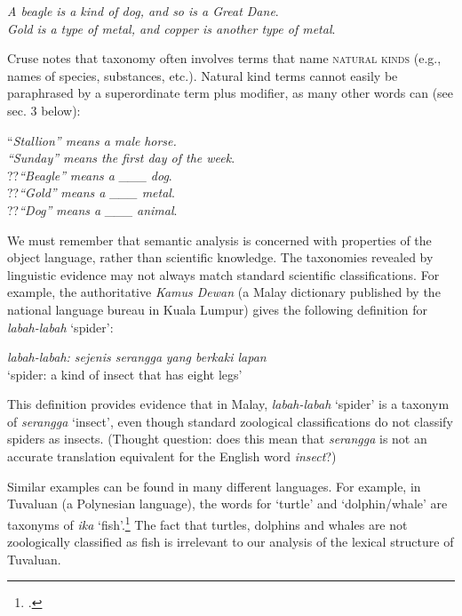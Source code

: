 \ea \label{ex:6.19} \ea \textit{A beagle} \textit{is a kind of dog, and so is a Great Dane}.\\
\ex \textit{Gold} \textit{is a type of metal, and copper is another type of metal}.
\z \z


Cruse notes that taxonomy often involves terms that name \textsc{natural kinds} (e.g., names of species, substances, etc.). Natural kind terms cannot easily be paraphrased by a superordinate term plus modifier, as many other words can (see sec. 3 below):


\ea 
\label{ex:6.20}
\ea “\textit{Stallion” means a male} \textit{horse.}\\
\ex \textit{“Sunday” mean}\textit{s the first day of the week}.\\
\ex ??\textit{“Beagle”} \textit{means a \_\_\_} \textit{dog}.\\
\ex ??\textit{“Gold”} \textit{means a \_\_\_ metal}.\\
\ex ??\textit{“Dog”} \textit{means a \_\_\_} \textit{animal}.
\z \z


We must remember that semantic analysis is concerned with properties of the object language, rather than scientific knowledge. The taxonomies revealed by linguistic evidence may not always match standard scientific classifications. For example, the authoritative \textit{Kamus Dewan} (a Malay dictionary published by the national language bureau in Kuala Lumpur) gives the following definition for \textit{labah-labah} ‘spider’:


\ea \label{ex:6.21
}\textit{labah-labah: sejenis serangga} \textit{yang berkaki lapan}\\
‘spider: a kind of insect that has eight legs’
\z


This definition provides evidence that in Malay, \textit{labah-labah} ‘spider’ is a taxonym of \textit{serangga} ‘insect’, even though standard zoological classifications do not classify spiders as insects. (Thought question: does this mean that \textit{serangga} is not an accurate translation equivalent for the English word \textit{insect}?)



Similar examples can be found in many different languages. For example, in Tuvaluan (a Polynesian language), the words for ‘turtle’ and ‘dolphin/whale’ are taxonyms of \textit{ika} ‘fish’.\footnote{\citet[192]{Finegan1999}.} The fact that turtles, dolphins and whales are not zoologically classified as fish is irrelevant to our analysis of the lexical structure of Tuvaluan.


